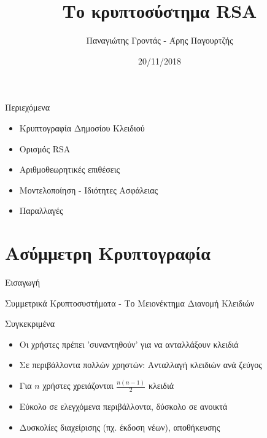 \documentclass[handout]{beamer}
\title{Το κρυπτοσύστημα RSA}
\author{Παναγιώτης Γροντάς - Άρης Παγουρτζής}
\date{20/11/2018}
\institute{ΕΜΠ - Κρυπτογραφία (2018-2019)}
\begin{document}
\newcommand{\xor}{ \oplus }
\newcommand{\MSG}{ \mathtt{M} }
\newcommand{\KEY}{ \mathtt{K} }
\newcommand{\CPH}{ \mathtt{C} }
\newcommand{\keygen}{\mathtt{KeyGen}}
\newcommand{\enc}{\mathtt{Enc}}
\newcommand{\dec}{\mathtt{Dec}}
\newcommand{\adv}{$\mathcal{A} \,$ }
\newcommand{\advb}{$\mathcal{B} \,$ }
\newcommand{\chal}{$\mathcal{C} \,$ }
\newcommand{\cs}{$\mathcal{CS} \,$ }
\newcommand{\zns}{  \mathbb{Z}^*_n }
\newcommand{\zn}{  \mathbb{Z}_n }

\newcommand{\green}[1]{\textcolor{teal}{#1}}
\newcommand{\Green}[1]{\textcolor{Teal}{#1}}
\newcommand{\ForestGreen}[1]{\textcolor{ForestGreen}{#1}}
\newcommand{\blue}[1]{\textcolor{blue}{#1}}
\newcommand{\magenta}[1]{\textcolor{magenta}{#1}}
\newcommand{\cyan}[1]{\textcolor{cyan}{#1}}

\newcommand{\twopartdef}[4]
{ 
		\begin{cases}
			#1 , #2 \\
			#3 , #4
		\end{cases} 
}

\begin{frame}
\titlepage
\end{frame}


\npthousandsep{ }
\begin{frame}{Περιεχόμενα}
\begin{itemize}
\item Κρυπτογραφία Δημοσίου Κλειδιού
\item Ορισμός RSA
\item Αριθμοθεωρητικές επιθέσεις
\item Μοντελοποίηση - Ιδιότητες Ασφάλειας
\item Παραλλαγές
\end{itemize}
\end{frame}

\section{Ασύμμετρη Κρυπτογραφία}
\begin{frame}{Εισαγωγή}
\begin{block}{Συμμετρικά Κρυπτοσυστήματα - \alert{Το Μειονέκτημα}}
Διανομή Κλειδιών
\end{block}
\pause
\begin{block}{Συγκεκριμένα}
\begin{itemize}
\item Οι χρήστες πρέπει 'συναντηθούν' για να ανταλλάξουν κλειδιά \pause
\item Σε περιβάλλοντα πολλών χρηστών: Ανταλλαγή κλειδιών ανά ζεύγος
\item Για $n$ χρήστες χρειάζονται $\frac{n(n-1)}{2}$ κλειδιά \pause
\item Εύκολο σε ελεγχόμενα περιβάλλοντα, δύσκολο σε ανοικτά \pause
\item Δυσκολίες διαχείρισης (πχ. έκδοση νέων), αποθήκευσης
\end{itemize}
\end{block}
\end{frame}
\end{document}
